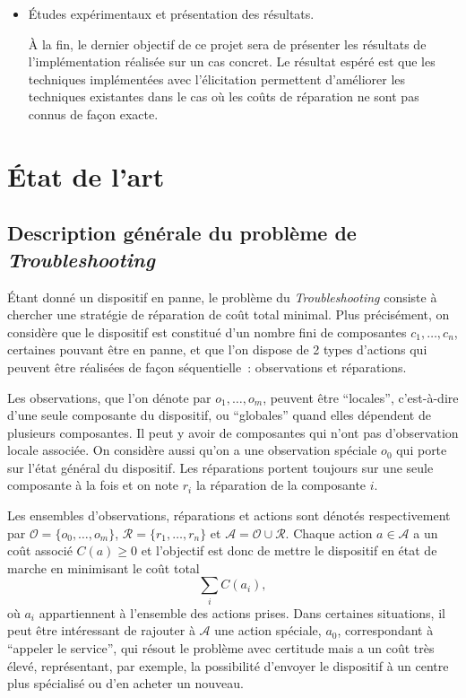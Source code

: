 \documentclass[a4paper,11pt]{article}
\theoremstyle{plain}
\begin{document}
\begin{itemize}
\item Études expérimentaux et présentation des résultats.

À la fin, le dernier objectif de ce projet sera de présenter les résultats de l'implémentation réalisée sur un cas concret.  Le résultat espéré est que les techniques implémentées avec l'élicitation permettent d'améliorer les techniques existantes dans le cas où les coûts de réparation ne sont pas connus de façon exacte.

\end{itemize}

\section{État de l'art}
\label{SecEtatDeLArt}

\subsection{Description générale du problème de \emph{Troubleshooting}}

Étant donné un dispositif en panne, le problème du \emph{Troubleshooting} consiste à chercher une stratégie de réparation de coût total minimal. Plus précisément, on considère que le dispositif est constitué d'un nombre fini de composantes $c_1, \dotsc, c_n$, certaines pouvant être en panne, et que l'on dispose de 2 types d'actions qui peuvent être réalisées de façon séquentielle~: observations et réparations.

Les observations, que l'on dénote par $o_1, \dotsc, o_m$,  peuvent être ``locales'', c'est-à-dire d'une seule composante du dispositif, ou ``globales'' quand elles dépendent de plusieurs composantes. Il peut y avoir de composantes qui n'ont pas d'observation locale associée. On considère aussi qu'on a une observation spéciale $o_0$ qui porte sur l'état général du dispositif. Les réparations portent toujours sur une seule composante à la fois et on note $r_i$ la réparation de la composante $i$. 

Les ensembles d'observations, réparations et actions sont dénotés respectivement par $\mathcal O = \{ o_0, \dotsc, o_m\}$, $\mathcal R = \{r_1, \dotsc, r_n\}$ et $\mathcal A = \mathcal O \cup \mathcal R$. Chaque action $a \in \mathcal A$ a un coût associé $C(a) \geq 0$ et l'objectif est donc de mettre le dispositif en état de marche en minimisant le coût total \[\sum_i C(a_i),\] où $a_i$ appartiennent à l'ensemble des actions prises. Dans certaines situations, il peut être intéressant de rajouter à $\mathcal A$ une action spéciale, $a_0$, correspondant à ``appeler le service'', qui résout le problème avec certitude mais a un coût très élevé, représentant, par exemple, la possibilité d'envoyer le dispositif à un centre plus spécialisé ou d'en acheter un nouveau.
\end{document}
